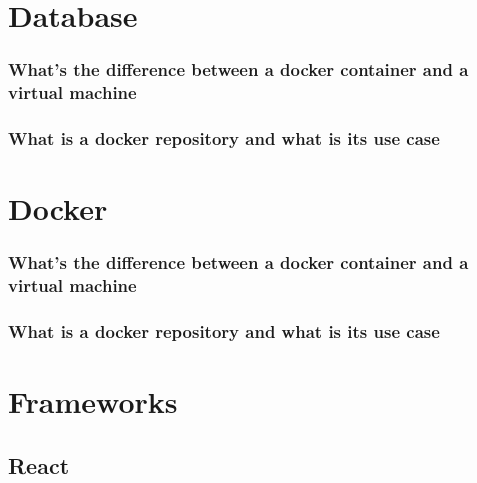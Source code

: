 \documentclass[12pt, a4paper]{article}
\begin{document}
\pagebreak

\section*{Database}
\subsubsection*{What's the difference between a docker container and a virtual machine}

\subsubsection*{What is a docker repository and what is its use case}



\pagebreak

\section*{Docker}
\subsubsection*{What's the difference between a docker container and a virtual machine}

\subsubsection*{What is a docker repository and what is its use case}

\pagebreak

\section*{Frameworks}
\subsection*{React}
\end{document}
